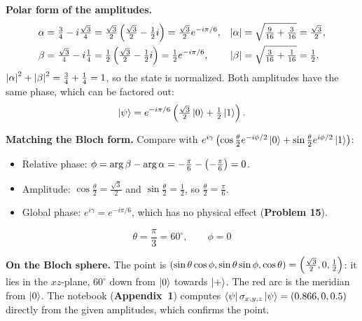 \documentclass[a4paper, 10pt]{article}
\begin{document}
\begin{solution}
	\noindent \textbf{Polar form of the amplitudes.}
	\begin{align*}
		\alpha & = \tfrac{3}{4} - i\tfrac{\sqrt{3}}{4} = \tfrac{\sqrt{3}}{2}\left(\tfrac{\sqrt{3}}{2} - \tfrac{1}{2}i\right) = \tfrac{\sqrt{3}}{2}e^{-i\pi/6}, & \left|\alpha\right| & = \sqrt{\tfrac{9}{16} + \tfrac{3}{16}} = \tfrac{\sqrt{3}}{2}, \\
		\beta  & = \tfrac{\sqrt{3}}{4} - i\tfrac{1}{4} = \tfrac{1}{2}\left(\tfrac{\sqrt{3}}{2} - \tfrac{1}{2}i\right) = \tfrac{1}{2}e^{-i\pi/6},                  & \left|\beta\right|  & = \sqrt{\tfrac{3}{16} + \tfrac{1}{16}} = \tfrac{1}{2}.
	\end{align*}
	\( \left|\alpha\right|^2 + \left|\beta\right|^2 = \tfrac{3}{4} + \tfrac{1}{4} = 1 \), so the state is normalized. Both amplitudes have the same phase, which can be factored out:
	\[
		\ket{\psi} = e^{-i\pi/6}\left(\tfrac{\sqrt{3}}{2}\ket{0} + \tfrac{1}{2}\ket{1}\right).
	\]

	\myspace

	\noindent \textbf{Matching the Bloch form.} Compare with \( e^{i\gamma}\left(\cos\tfrac{\theta}{2}e^{-i\phi/2}\ket{0} + \sin\tfrac{\theta}{2}e^{i\phi/2}\ket{1}\right) \):
	\begin{itemize}
		\item Relative phase: \( \phi = \arg\beta - \arg\alpha = -\tfrac{\pi}{6} - \left(-\tfrac{\pi}{6}\right) = 0 \).
		\item Amplitude: \( \cos\tfrac{\theta}{2} = \tfrac{\sqrt{3}}{2} \) and \( \sin\tfrac{\theta}{2} = \tfrac{1}{2} \), so \( \tfrac{\theta}{2} = \tfrac{\pi}{6} \).
		\item Global phase: \( e^{i\gamma} = e^{-i\pi/6} \), which has no physical effect (\textbf{Problem 15}).
	\end{itemize}
	\[
		\boxed{\theta = \frac{\pi}{3} = 60^{\circ}, \qquad \phi = 0}
	\]

	\myspace

	\noindent \textbf{On the Bloch sphere.} The point is \( (\sin\theta\cos\phi, \sin\theta\sin\phi, \cos\theta) = \left(\tfrac{\sqrt{3}}{2}, 0, \tfrac{1}{2}\right) \): it lies in the \( xz \)-plane, \( 60^{\circ} \) down from \( \ket{0} \) towards \( \ket{+} \). The red arc is the meridian from \( \ket{0} \).
	\noindent The notebook (\textbf{Appendix~1}) computes \( \bra{\psi}\sigma_{x, y, z}\ket{\psi} = \left(0.866, 0, 0.5\right) \) directly from the given amplitudes, which confirms the point.
\end{solution}
\end{document}
